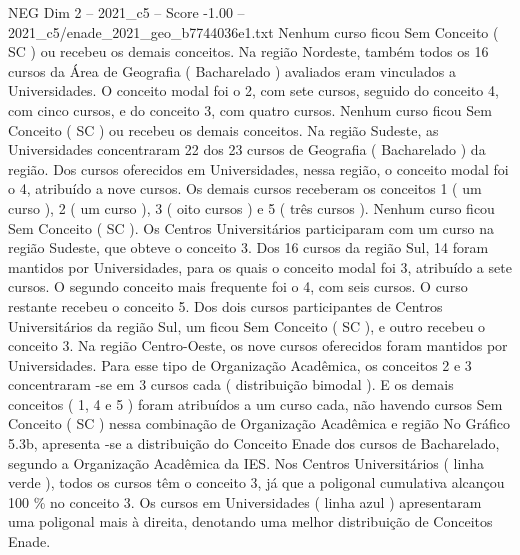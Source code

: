 \begin{textsample}{NEG Dim 2 – 2021\_c5 – Score -1.00 – 2021\_c5/enade\_2021\_geo\_b7744036e1.txt}
Nenhum curso ficou Sem Conceito ( SC ) ou recebeu os demais conceitos.
Na região Nordeste, também todos os 16 cursos da Área de Geografia ( Bacharelado ) avaliados eram vinculados a Universidades.
O conceito modal foi o 2, com sete cursos, seguido do conceito 4, com cinco cursos, e do conceito 3, com quatro cursos.
Nenhum curso ficou Sem Conceito ( SC ) ou recebeu os demais conceitos.
Na região Sudeste, as Universidades concentraram 22 dos 23 cursos de Geografia ( Bacharelado ) da região.
Dos cursos oferecidos em Universidades, nessa região, o conceito modal foi o 4, atribuído a nove cursos.
Os demais cursos receberam os conceitos 1 ( um curso ), 2 ( um curso ), 3 ( oito cursos ) e 5 ( três cursos ).
Nenhum curso ficou Sem Conceito ( SC ).
Os Centros Universitários participaram com um curso na região Sudeste, que obteve o conceito 3.
Dos 16 cursos da região Sul, 14 foram mantidos por Universidades, para os quais o conceito modal foi 3, atribuído a sete cursos.
O segundo conceito mais frequente foi o 4, com seis cursos.
O curso restante recebeu o conceito 5.
Dos dois cursos participantes de Centros Universitários da região Sul, um ficou Sem Conceito ( SC ), e outro recebeu o conceito 3.
Na região Centro-Oeste, os nove cursos oferecidos foram mantidos por Universidades.
Para esse tipo de Organização Acadêmica, os conceitos 2 e 3 concentraram -se em 3 cursos cada ( distribuição bimodal ).
E os demais conceitos ( 1, 4 e 5 ) foram atribuídos a um curso cada, não havendo cursos Sem Conceito ( SC ) nessa combinação de Organização Acadêmica e região No Gráfico 5.3b, apresenta -se a distribuição do Conceito Enade dos cursos de Bacharelado, segundo a Organização Acadêmica da IES.
Nos Centros Universitários ( linha verde ), todos os cursos têm o conceito 3, já que a poligonal cumulativa alcançou 100 \% no conceito 3.
Os cursos em Universidades ( linha azul ) apresentaram uma poligonal mais à direita, denotando uma melhor distribuição de Conceitos Enade.

\end{textsample}

